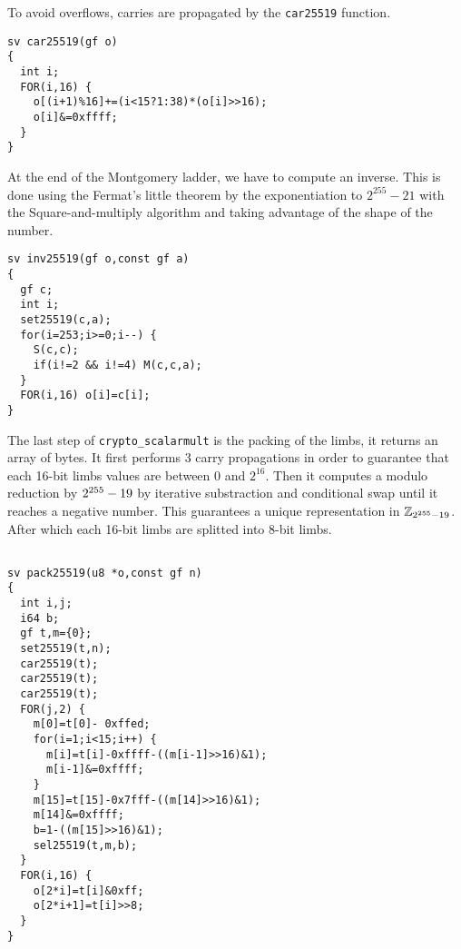 To avoid overflows, carries are propagated by the \texttt{car25519} function.
\begin{lstlisting}[language=Ctweetnacl]
sv car25519(gf o)
{
  int i;
  FOR(i,16) {
    o[(i+1)%16]+=(i<15?1:38)*(o[i]>>16);
    o[i]&=0xffff;
  }
}
\end{lstlisting}

At the end of the Montgomery ladder, we have to compute an inverse.
This is done using the Fermat's little theorem by the exponentiation to
$2^{255}-21$ with the Square-and-multiply algorithm and taking
advantage of the shape of the number.
\begin{lstlisting}[language=Ctweetnacl]
sv inv25519(gf o,const gf a)
{
  gf c;
  int i;
  set25519(c,a);
  for(i=253;i>=0;i--) {
    S(c,c);
    if(i!=2 && i!=4) M(c,c,a);
  }
  FOR(i,16) o[i]=c[i];
}
\end{lstlisting}

The last step of \texttt{crypto\_scalarmult} is the packing of the limbs, it returns
an array of bytes. It first performs 3 carry propagations in order to guarantee
that each 16-bit limbs values are between $0$ and $2^{16}$.
Then it computes a modulo reduction by $2^{255}-19$ by iterative substraction and
conditional swap until it reaches a negative number.
This guarantees a unique representation in $\mathbb{Z}_{2^{255}-19}$.
After which each 16-bit limbs are splitted into 8-bit limbs.
\begin{lstlisting}[language=Ctweetnacl]

sv pack25519(u8 *o,const gf n)
{
  int i,j;
  i64 b;
  gf t,m={0};
  set25519(t,n);
  car25519(t);
  car25519(t);
  car25519(t);
  FOR(j,2) {
    m[0]=t[0]- 0xffed;
    for(i=1;i<15;i++) {
      m[i]=t[i]-0xffff-((m[i-1]>>16)&1);
      m[i-1]&=0xffff;
    }
    m[15]=t[15]-0x7fff-((m[14]>>16)&1);
    m[14]&=0xffff;
    b=1-((m[15]>>16)&1);
    sel25519(t,m,b);
  }
  FOR(i,16) {
    o[2*i]=t[i]&0xff;
    o[2*i+1]=t[i]>>8;
  }
}
\end{lstlisting}

